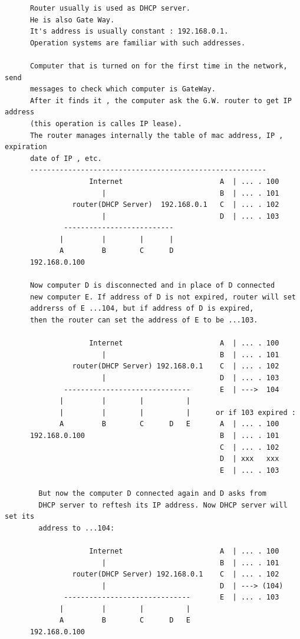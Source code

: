 \documentclass[a4paper,12pt]{article}
\begin{document}
\begin{verbatim}
      Router usually is used as DHCP server. 
      He is also Gate Way. 
      It's address is usually constant : 192.168.0.1. 
      Operation systems are familiar with such addresses.
      
      Computer that is turned on for the first time in the network, send 
      messages to check which computer is GateWay. 
      After it finds it , the computer ask the G.W. router to get IP address 
      (this operation is calles IP lease).
      The router manages internally the table of mac address, IP , expiration 
      date of IP , etc.
      --------------------------------------------------------
                    Internet                       A  | ... . 100
                       |                           B  | ... . 101
                router(DHCP Server)  192.168.0.1   C  | ... . 102
                       |                           D  | ... . 103
              --------------------------       
             |         |        |      |
             A         B        C      D
      192.168.0.100
      
      Now computer D is disconnected and in place of D connected 
      new computer E. If address of D is not expired, router will set 
      addrerss of E ...104, but if address of D is expired, 
      then the router can set the address of E to be ...103.  
      
                    Internet                       A  | ... . 100
                       |                           B  | ... . 101
                router(DHCP Server) 192.168.0.1    C  | ... . 102
                       |                           D  | ... . 103
              ------------------------------       E  | --->  104
             |         |        |          |  
             |         |        |          |      or if 103 expired :
             A         B        C      D   E       A  | ... . 100
      192.168.0.100                                B  | ... . 101
                                                   C  | ... . 102
                                                   D  | xxx   xxx
                                                   E  | ... . 103
        
        But now the computer D connected again and D asks from 
        DHCP server to reftesh its IP address. Now DHCP server will set its 
        address to ...104:
  
                    Internet                       A  | ... . 100
                       |                           B  | ... . 101
                router(DHCP Server) 192.168.0.1    C  | ... . 102
                       |                           D  | ---> (104)
              ------------------------------       E  | ... . 103
             |         |        |          |  
             A         B        C      D   E       
      192.168.0.100                                 
                                                    

\end{verbatim}
\end{document}
